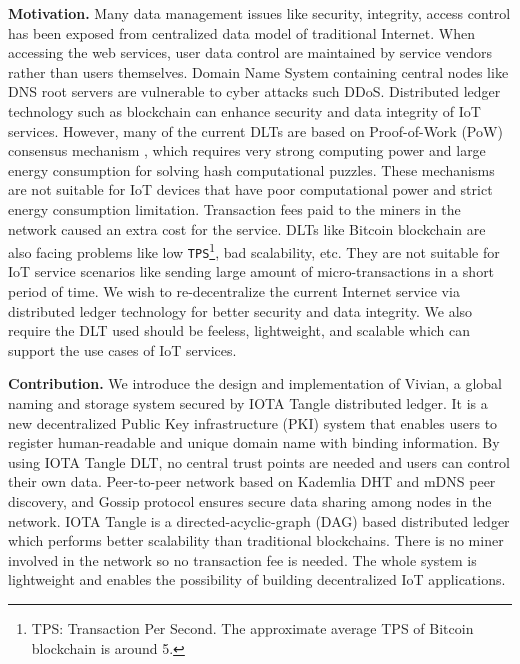 \begin{onehalfspace}
\end{onehalfspace}
\noindent\textbf{Motivation.} Many data management issues like security, integrity, access control has been exposed from centralized data model of traditional Internet. 
When accessing the web services, user data control are maintained by service vendors rather than users themselves.
Domain Name System containing central nodes like DNS root servers are vulnerable to cyber attacks such DDoS. 
Distributed ledger technology such as blockchain can enhance security and data integrity of IoT services. 
However, many of the current DLTs are based on Proof-of-Work (PoW) consensus mechanism \cite{10.1145/2976749.2978341}, which requires very strong computing power and large energy consumption for solving hash computational puzzles.
These mechanisms are not suitable for IoT devices that have poor computational power and strict energy consumption limitation. Transaction fees paid to the miners in the network caused an extra cost for the service. 
DLTs like Bitcoin blockchain are also facing problems like low \texttt{TPS}\footnote{TPS: Transaction Per Second. The approximate average TPS of Bitcoin blockchain is around 5.}, bad scalability, etc.
They are not suitable for IoT service scenarios like sending large amount of micro-transactions in a short period of time. We wish to re-decentralize the current Internet service via distributed ledger technology for better security and data integrity.
We also require the DLT used should be feeless, lightweight, and scalable which can support the use cases of IoT services.


\begin{onehalfspace}
\end{onehalfspace}
\noindent\textbf{Contribution.} We introduce the design and implementation of Vivian, a global naming and storage system secured by IOTA Tangle distributed ledger. 
It is a new decentralized Public Key infrastructure (PKI) system that enables users to register human-readable and unique domain name with binding information. 
By using IOTA Tangle DLT, no central trust points are needed and users can control their own data. 
Peer-to-peer network based on Kademlia DHT and mDNS peer discovery, and Gossip protocol ensures secure data sharing among nodes in the network.
IOTA Tangle is a directed-acyclic-graph (DAG) based distributed ledger which performs better scalability than traditional blockchains. There is no miner involved in the network so no transaction fee is needed.
The whole system is lightweight and enables the possibility of building decentralized IoT applications.